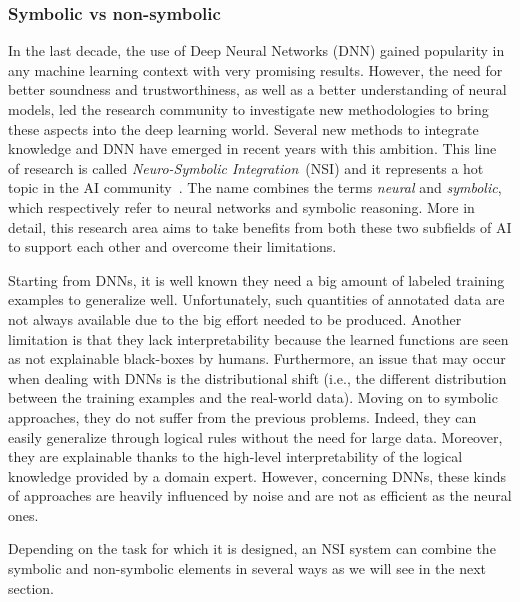 \subsubsection{Symbolic vs non-symbolic}
In the last decade, the use of Deep Neural Networks (DNN) gained popularity in any machine learning context with very promising results. However, the need for better soundness and trustworthiness, as well as a better understanding of neural models, led the research community to investigate new methodologies to bring these aspects into the deep learning world. Several new methods to integrate knowledge and DNN have emerged in recent years with this ambition. This line of research is called \textit{Neuro-Symbolic Integration}~(NSI) and it represents a hot topic in the AI community~\cite{3rdWave}. The name combines the terms \textit{neural} and \textit{symbolic}, which respectively refer to neural networks and symbolic reasoning. More in detail, this research area aims to take benefits from both these two subfields of AI to support each other and overcome their limitations.

Starting from DNNs, it is well known they need a big amount of labeled training examples to generalize well. Unfortunately, such quantities of annotated data are not always available due to the big effort needed to be produced. Another limitation is that they lack interpretability because the learned functions are seen as not explainable black-boxes by humans. Furthermore, an issue that may occur when dealing with DNNs is the distributional shift (i.e., the different distribution between the training examples and the real-world data). Moving on to symbolic approaches, they do not suffer from the previous problems. Indeed, they can easily generalize through logical rules without the need for large data. Moreover, they are explainable thanks to the high-level interpretability of the logical knowledge provided by a domain expert. However, concerning DNNs, these kinds of approaches are heavily influenced by noise and are not as efficient as the neural ones.

Depending on the task for which it is designed, an NSI system can combine the symbolic and non-symbolic elements in several ways as we will see in the next section.